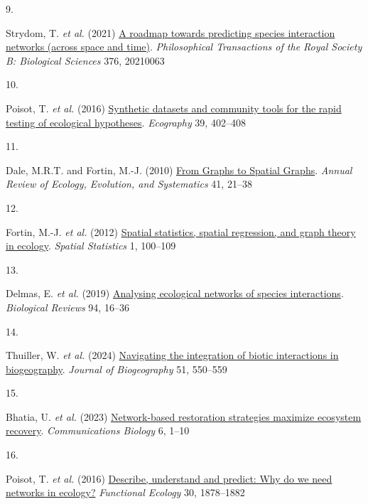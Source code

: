 \documentclass[
]{article}
\newlength{\cslhangindent}
\newlength{\csllabelwidth}
\newenvironment{CSLReferences}[2] %
 {\begin{list}{}{%
  \setlength{\itemindent}{0pt}
  \setlength{\leftmargin}{0pt}
  \setlength{\parsep}{0pt}
  \ifodd #1
   \setlength{\leftmargin}{\cslhangindent}
   \setlength{\itemindent}{-1\cslhangindent}
  \fi
  \setlength{\itemsep}{#2\baselineskip}}}
 {\end{list}}
\newcommand{\CSLLeftMargin}[1]{\parbox[t]{\csllabelwidth}{\strut#1\strut}}
\newcommand{\CSLRightInline}[1]{\parbox[t]{\linewidth - \csllabelwidth}{\strut#1\strut}}
\begin{document}
\begin{CSLReferences}{0}{0}
\CSLLeftMargin{9. }%
\CSLRightInline{Strydom, T. \emph{et al.} (2021)
\href{https://doi.org/10.1098/rstb.2021.0063}{A roadmap towards
predicting species interaction networks (across space and time)}.
\emph{Philosophical Transactions of the Royal Society B: Biological
Sciences} 376, 20210063}

\CSLLeftMargin{10. }%
\CSLRightInline{Poisot, T. \emph{et al.} (2016)
\href{https://doi.org/10.1111/ecog.01941}{Synthetic datasets and
community tools for the rapid testing of ecological hypotheses}.
\emph{Ecography} 39, 402--408}

\CSLLeftMargin{11. }%
\CSLRightInline{Dale, M.R.T. and Fortin, M.-J. (2010)
\href{https://www.jstor.org/stable/27896212}{From {Graphs} to {Spatial
Graphs}}. \emph{Annual Review of Ecology, Evolution, and Systematics}
41, 21--38}

\CSLLeftMargin{12. }%
\CSLRightInline{Fortin, M.-J. \emph{et al.} (2012)
\href{https://doi.org/10.1016/j.spasta.2012.02.004}{Spatial statistics,
spatial regression, and graph theory in ecology}. \emph{Spatial
Statistics} 1, 100--109}

\CSLLeftMargin{13. }%
\CSLRightInline{Delmas, E. \emph{et al.} (2019)
\href{https://doi.org/10.1111/brv.12433}{Analysing ecological networks
of species interactions}. \emph{Biological Reviews} 94, 16--36}

\CSLLeftMargin{14. }%
\CSLRightInline{Thuiller, W. \emph{et al.} (2024)
\href{https://doi.org/10.1111/jbi.14734}{Navigating the integration of
biotic interactions in biogeography}. \emph{Journal of Biogeography} 51,
550--559}

\CSLLeftMargin{15. }%
\CSLRightInline{Bhatia, U. \emph{et al.} (2023)
\href{https://doi.org/10.1038/s42003-023-05622-3}{Network-based
restoration strategies maximize ecosystem recovery}.
\emph{Communications Biology} 6, 1--10}

\CSLLeftMargin{16. }%
\CSLRightInline{Poisot, T. \emph{et al.} (2016)
\href{https://www.jstor.org/stable/48582345}{Describe, understand and
predict: Why do we need networks in ecology?} \emph{Functional Ecology}
30, 1878--1882}


\end{CSLReferences}
\end{document}
